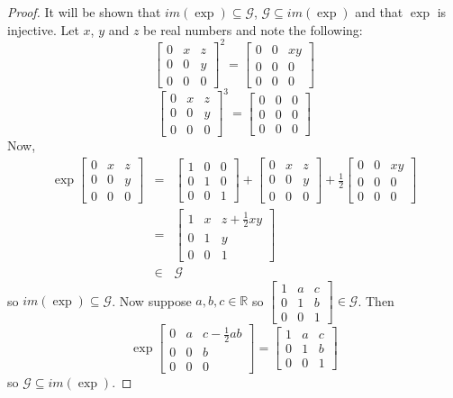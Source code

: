 \documentclass[honours]{UNSWthesis}
\newcommand{\R}{\mathbb{R}}
\newcommand{\G}{\mathcal{G}}
\newcommand{\1}{\mathbf{e}_{1}}
\newcommand{\2}{\mathbf{e}_{3}}
\newcommand{\3}{\mathbf{e}_{3}}
\begin{document}
\begin{proof}
It will be shown that $im(\exp) \subseteq \G$, $\G \subseteq im(\exp)$ and that $\exp$ is injective. 
Let $x$, $y$ and $z$ be real numbers and note the following: 
\[
\begin{bmatrix} 0 & x & z \\ 0 & 0 & y \\ 0 & 0 & 0 \end{bmatrix}^2=\begin{bmatrix} 0 & 0 & xy \\ 0 & 0 & 0 \\ 0 & 0 & 0 \end{bmatrix}
\]
\[
\begin{bmatrix} 0 & x & z \\ 0 & 0 & y \\ 0 & 0 & 0 \end{bmatrix}^3=\begin{bmatrix} 0 & 0 & 0 \\ 0 & 0 & 0 \\ 0 & 0 & 0 \end{bmatrix}
\]
Now,
\begin{eqnarray*}
 \exp \begin{bmatrix} 0 & x & z \\ 0 & 0 & y \\ 0 & 0 & 0 \end{bmatrix} &=& \begin{bmatrix} 1 & 0 & 0 \\ 0 & 1 & 0 \\ 0 & 0 & 1 \end{bmatrix} + \begin{bmatrix} 0 & x & z \\ 0 & 0 & y \\ 0 & 0 & 0 \end{bmatrix}+ \frac{1}{2}\begin{bmatrix} 0 & 0 & xy \\ 0 & 0 & 0 \\ 0 & 0 & 0 \end{bmatrix} \\
&=& \begin{bmatrix} 1 & x & z+\frac{1}{2}xy \\ 0 & 1 & y \\ 0 & 0 & 1 \end{bmatrix} \\
&\in & \G
\end{eqnarray*} so $ im(\exp) \subseteq \G$.
Now suppose $a,b,c \in \R$ so $\begin{bmatrix} 1 & a & c \\ 0 & 1 & b \\ 0 & 0 & 1 \end{bmatrix} \in \G$. Then 
\[ 
\exp  \begin{bmatrix} 0 & a & c-\frac{1}{2}ab \\ 0 & 0 & b \\ 0 & 0 & 0 \end{bmatrix} = \begin{bmatrix} 1 & a & c \\ 0 & 1 & b \\ 0 & 0 & 1 \end{bmatrix}
\]
so $\G \subseteq im(\exp)$.


\end{proof}
\end{document}
